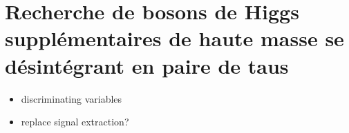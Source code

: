 \chapter{Recherche de bosons de Higgs supplémentaires de haute masse se désintégrant en paire de taus}\label{chapter-HTT_analysis}








\begin{itemize}
\item discriminating variables
\item replace signal extraction?
\end{itemize}




